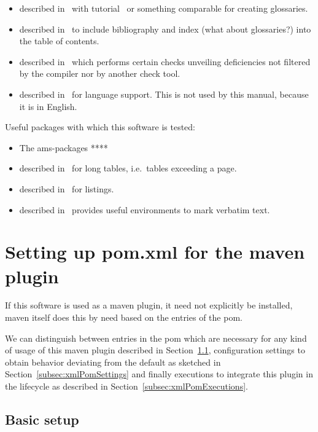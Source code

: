 \begin{itemize}
or something comparable for creating indices. 
\item 
{} described in~\cite{GloP4_54} 
with tutorial~\cite{GloPGuide4_54}
or something comparable for creating glossaries. 
\item 
{} described in~\cite{TocBibIndP} 
to include bibliography and index (what about glossaries?) 
into the table of contents. 
\item 
{} described in~\cite{NagP} 
which performs certain checks unveiling deficiencies 
not filtered by the compiler nor by another check tool. 
\item 
{} described in~\cite{BabelP24} for language support. 
This is not used by this manual, because it is in English. 
\end{itemize}

\noindent
Useful packages with which this software is tested: 
%
\begin{itemize}
\item
The ams-packages **** 
\item
{} described in~\cite{LongTabP} 
for long tables, i.e.~tables exceeding a page. 
\item
{} described in~\cite{ListingsP} for listings. 
\item
{} described in~\cite{FancyVerbP} 
provides useful environments to mark verbatim text. 
\end{itemize}


\section{Setting up pom.xml for the maven plugin}\label{sec:xmlPom}

If this software is used as a maven plugin,
it need not explicitly be installed, maven itself does this by need
based on the entries of the pom. 

We can distinguish between entries in the pom 
which are necessary for any kind of usage of this maven plugin 
described in Section~\ref{subsec:xmlPomBasic}, 
configuration settings to obtain behavior deviating from the default 
as sketched in Section~\ref{subsec:xmlPomSettings} 
and finally executions to integrate this plugin in the lifecycle 
as described in Section~\ref{subsec:xmlPomExecutions}. 

\subsection{Basic setup}\label{subsec:xmlPomBasic}

